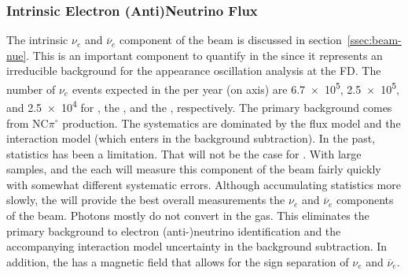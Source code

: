 \subsubsection{Intrinsic Electron (Anti)Neutrino Flux}
The intrinsic $\nu_{e}$ and $\overline{\nu}_{e}$ component of the beam is 
discussed in section~\ref{ssec:beam-nue}.  This is an important component to quantify in the   since it represents an irreducible background for the appearance oscillation analysis at the FD.  The number of  $\nu_{e}$ events expected in the  per year (on axis) are \num{6.7e5}, \num{2.5e5}, and \num{2.5e4} for , the , and the , respectively.  The primary background comes from NC$\pi^{\circ}$ production.  The systematics are dominated by the flux model and the interaction model (which enters in the background subtraction).  In the past, statistics has been a limitation.  That will not be the case for  .  With large samples,  and the  each will measure this component of the beam fairly quickly with somewhat different systematic errors.  Although accumulating statistics more slowly, the  will provide the best overall measurements the $\nu_{e}$ and $\overline{\nu}_{e}$ components of the beam.  Photons mostly do not convert in the gas.  This eliminates the primary background to electron (anti-)neutrino identification and the accompanying interaction model uncertainty in the background subtraction.  In addition, the  has a magnetic field that allows for the sign separation of $\nu_{e}$ and $\overline{\nu}_{e}$.  


